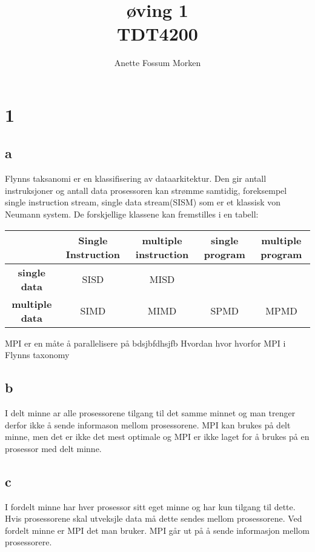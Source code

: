 \documentclass[12pt, a4paper]{article} %
\title{øving 1 \\ TDT4200}
\author[1]{Anette Fossum Morken}
\date{}
\begin{document}
\maketitle

\section*{1}
\subsection*{a}
Flynns taksanomi er en klassifisering av dataarkitektur. Den gir antall instruksjoner og antall data prosessoren kan strømme samtidig, foreksempel single instruction stream, single data stream(SISM) som er et klassisk von Neumann system. De forskjellige klassene kan fremstilles i en tabell:

  \begin{tabular}{|@{}c@{}| @{}c@{} |@{}c@{}|@{} c@{} |@{}c@{}| }
    \hline
     & \textbf{Single Instruction} & \textbf{multiple instruction} & \textbf{single program} & \textbf{multiple program} \\ \hline
    \textbf{single data} & SISD & MISD & &  \\ \hline
    \textbf{multiple data} & SIMD & MIMD & SPMD & MPMD \\
    \hline
  \end{tabular}
MPI er en måte å parallelisere på bdsjbfdhsjfb
Hvordan 
hvor 
hvorfor  MPI i Flynns taxonomy

\subsection*{b}
I delt minne ar alle prosessorene tilgang til det samme minnet og man trenger derfor ikke å sende informason mellom prosessorene. MPI kan brukes på delt minne, men det er ikke det mest optimale og MPI er ikke laget for å brukes på en prosessor med delt minne.

\subsection*{c}
I fordelt minne har hver prosessor sitt eget minne og har kun tilgang til dette. Hvis prosessorene skal utveksjle data må dette sendes mellom prosessorene. Ved fordelt minne er MPI det man bruker. MPI går ut på å sende informasjon mellom prosessorere.
\end{document}
